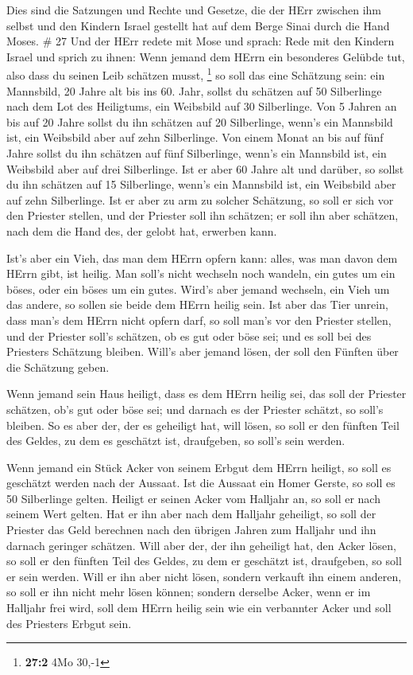  Dies sind die Satzungen und Rechte und Gesetze, die der
HErr zwischen ihm selbst und den Kindern Israel gestellt hat auf dem
Berge Sinai durch die Hand Moses. \# 27  Und der HErr redete
mit Mose und sprach:  Rede mit den Kindern Israel und sprich
zu ihnen: Wenn jemand dem HErrn ein besonderes Gelübde tut, also dass du
seinen Leib schätzen musst, \footnote{\textbf{27:2} 4Mo 30,-1}
 so soll das eine Schätzung sein: ein Mannsbild, 20 Jahre
alt bis ins 60. Jahr, sollst du schätzen auf 50 Silberlinge nach dem Lot
des Heiligtums,  ein Weibsbild auf 30 Silberlinge.
 Von 5 Jahren an bis auf 20 Jahre sollst du ihn schätzen auf
20 Silberlinge, wenn's ein Mannsbild ist, ein Weibsbild aber auf zehn
Silberlinge.  Von einem Monat an bis auf fünf Jahre sollst
du ihn schätzen auf fünf Silberlinge, wenn's ein Mannsbild ist, ein
Weibsbild aber auf drei Silberlinge.  Ist er aber 60 Jahre
alt und darüber, so sollst du ihn schätzen auf 15 Silberlinge, wenn's
ein Mannsbild ist, ein Weibsbild aber auf zehn Silberlinge. 
Ist er aber zu arm zu solcher Schätzung, so soll er sich vor den
Priester stellen, und der Priester soll ihn schätzen; er soll ihn aber
schätzen, nach dem die Hand des, der gelobt hat, erwerben kann.

 Ist's aber ein Vieh, das man dem HErrn opfern kann: alles,
was man davon dem HErrn gibt, ist heilig.  Man soll's nicht
wechseln noch wandeln, ein gutes um ein böses, oder ein böses um ein
gutes. Wird's aber jemand wechseln, ein Vieh um das andere, so sollen
sie beide dem HErrn heilig sein.  Ist aber das Tier unrein,
dass man's dem HErrn nicht opfern darf, so soll man's vor den Priester
stellen,  und der Priester soll's schätzen, ob es gut oder
böse sei; und es soll bei des Priesters Schätzung bleiben. 
Will's aber jemand lösen, der soll den Fünften über die Schätzung geben.

 Wenn jemand sein Haus heiligt, dass es dem HErrn heilig
sei, das soll der Priester schätzen, ob's gut oder böse sei; und darnach
es der Priester schätzt, so soll's bleiben.  So es aber
der, der es geheiligt hat, will lösen, so soll er den fünften Teil des
Geldes, zu dem es geschätzt ist, draufgeben, so soll's sein werden.

 Wenn jemand ein Stück Acker von seinem Erbgut dem HErrn
heiligt, so soll es geschätzt werden nach der Aussaat. Ist die Aussaat
ein Homer Gerste, so soll es 50 Silberlinge gelten. 
Heiligt er seinen Acker vom Halljahr an, so soll er nach seinem Wert
gelten.  Hat er ihn aber nach dem Halljahr geheiligt, so
soll der Priester das Geld berechnen nach den übrigen Jahren zum
Halljahr und ihn darnach geringer schätzen.  Will aber der,
der ihn geheiligt hat, den Acker lösen, so soll er den fünften Teil des
Geldes, zu dem er geschätzt ist, draufgeben, so soll er sein werden.
 Will er ihn aber nicht lösen, sondern verkauft ihn einem
anderen, so soll er ihn nicht mehr lösen können;  sondern
derselbe Acker, wenn er im Halljahr frei wird, soll dem HErrn heilig
sein wie ein verbannter Acker und soll des Priesters Erbgut sein.

